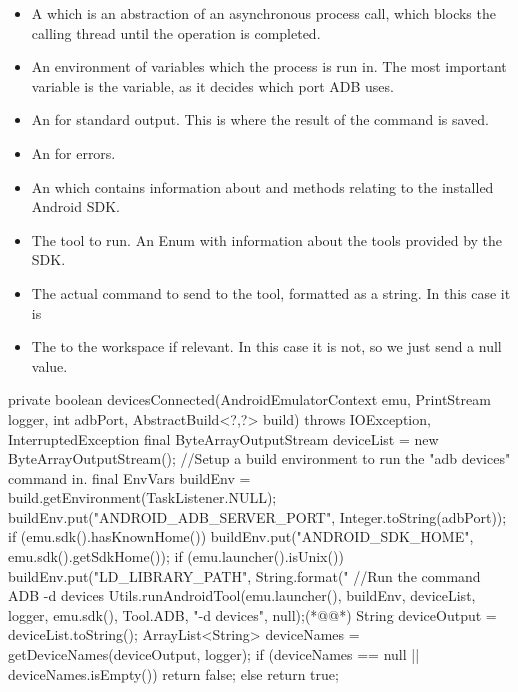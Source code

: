 \begin{itemize}
  \item A  which is an abstraction of an asynchronous process call, which blocks the calling thread until the operation is completed.
  \item An environment of variables which the process is run in. The most important variable is the  variable, as it decides which port ADB uses.
  \item An  for standard output. This is where the result of the command is saved.
  \item An  for errors.
  \item An  which contains information about and methods relating to the installed Android SDK.
  \item The tool to run. An Enum with information about the tools provided by the SDK.
  \item The actual command to send to the tool, formatted as a string. In this case it is 
  \item The  to the workspace if relevant. In this case it is not, so we just send a null value.
\end{itemize}

\begin{javacode}[caption=The devicesConnected method which checks for connected devices.,label=lst:deviceCheck]
private boolean devicesConnected(AndroidEmulatorContext emu, PrintStream logger, int adbPort, AbstractBuild<?,?> build)
throws IOException, InterruptedException {
    final ByteArrayOutputStream deviceList = new ByteArrayOutputStream();
    //Setup a build environment to run the "adb devices" command in.
    final EnvVars buildEnv = build.getEnvironment(TaskListener.NULL);
    buildEnv.put("ANDROID_ADB_SERVER_PORT", Integer.toString(adbPort));
    if (emu.sdk().hasKnownHome()) {
        buildEnv.put("ANDROID_SDK_HOME", emu.sdk().getSdkHome());
    }
    if (emu.launcher().isUnix()) {
        buildEnv.put("LD_LIBRARY_PATH", String.format("%
    }
    //Run the command ADB -d devices
    Utils.runAndroidTool(emu.launcher(), buildEnv, deviceList, logger, emu.sdk(), Tool.ADB, "-d devices", null);(*@\label{line:runTool}@*)
    String deviceOutput = deviceList.toString();
    ArrayList<String> deviceNames = getDeviceNames(deviceOutput, logger);
    if (deviceNames == null || deviceNames.isEmpty()) {
        return false;
    }
    else {
        return true;
    }
}
\end{javacode}

